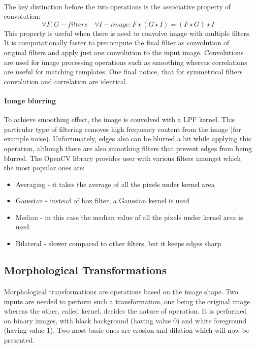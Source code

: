 \paragraph{}
The key distinction before the two operations is the associative property of convolution:
\begin{equation}
	\forall F, G - filters \quad \forall I - image: F \star (G \star I) = (F \star G) \star I
\end{equation}
This property is useful when there is need to convolve image with multiple filters. It is computationally faster to precompute the final filter as convolution of original filters and apply just one convolution to the input image. Convolutions are used for image processing operations such as smoothing whereas correlations are useful for matching templates.
One final notice, that for symmetrical filters convolution and correlation are identical.

\paragraph{Image blurring}
To achieve smoothing effect, the image is convolved with a LPF kernel. This particular type of filtering removes high frequency content from the image (for example noise). Unfortunately, edges also can be blurred a bit while applying this operation, although there are also smoothing filters that prevent edges from being blurred. The OpenCV library provides user with various filters amongst which the most popular ones are:
\begin{itemize}
	\item Averaging - it takes the average of all the pixels under kernel area
	\item Gaussian - instead of box filter, a Gaussian kernel is used
	\item Median - in this case the median value of all the pixels under kernel area is used
	\item Bilateral - slower compared to other filters, but it keeps edges sharp
\end{itemize}

\subsection{Morphological Transformations}
\paragraph{}
Morphological transformations are operations based on the image shape. Two inputs are needed to perform such a transformation, one being the original image whereas the other, called kernel, decides the nature of operation. It is performed on binary images, with black background (having value 0) and white foreground (having value 1). Two most basic ones are erosion and dilation which will now be presented.

